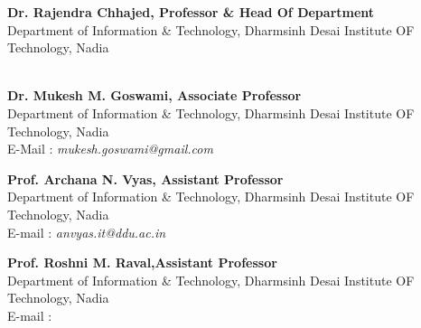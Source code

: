 \begin{cventries}


{\color{subheadings}\fontsize{10.5pt}{1em}\bodyfontlight\selectfont

\begin{flushleft}
\vspace{1mm}
\textbf{Dr. Rajendra Chhajed, Professor & Head Of Department}\\  \vspace{1mm}
	  Department of Information \& Technology, Dharmsinh Desai Institute OF Technology, Nadia  \\  \\
\end{flushleft}

\begin{flushleft}
\vspace{1mm}
\textbf{Dr. Mukesh M. Goswami, Associate Professor}\\  \vspace{1mm}
	  Department of Information \& Technology, Dharmsinh Desai Institute OF Technology, Nadia  \\  \vspace{1mm}  E-Mail : \textit{mukesh.goswami@gmail.com}\\
\end{flushleft}

\begin{flushleft}
\vspace{1mm}
\textbf{Prof. Archana N. Vyas, Assistant Professor}\\  \vspace{1mm}
	   Department of Information \& Technology, Dharmsinh Desai Institute OF Technology, Nadia  \\  \vspace{1mm}  E-mail : \textit{anvyas.it@ddu.ac.in }\\
\end{flushleft}

\begin{flushleft}
\vspace{1mm}
\textbf{Prof. Roshni M. Raval,Assistant Professor}\\  \vspace{1mm}
	   Department of Information \& Technology, Dharmsinh Desai Institute OF Technology, Nadia   \\  \vspace{1mm}  E-mail : \\
\end{flushleft}


\normalfont}
\end{cventries}